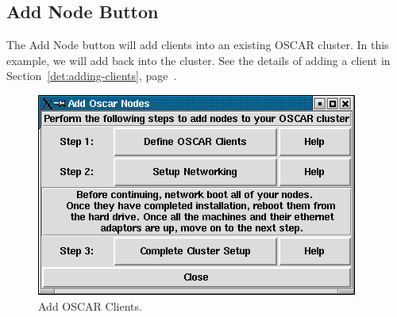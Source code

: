 
\subsection{Add Node Button}
\label{app:sbs-add-node}

The Add Node button will add clients into an existing OSCAR cluster.
In this example, we will add back  into the
cluster.  See the details of adding a client in
Section~\ref{det:adding-clients}, page~\pageref{det:adding-clients}.

\begin{figure}[h!]
  \begin{center}
    \centerline{\includegraphics[scale=\imgscale]{figs/9a_sbs-add-node}}
    \caption{Add OSCAR Clients.}
    \label{fig:sbs-add-node1}
  \end{center}
\end{figure}

